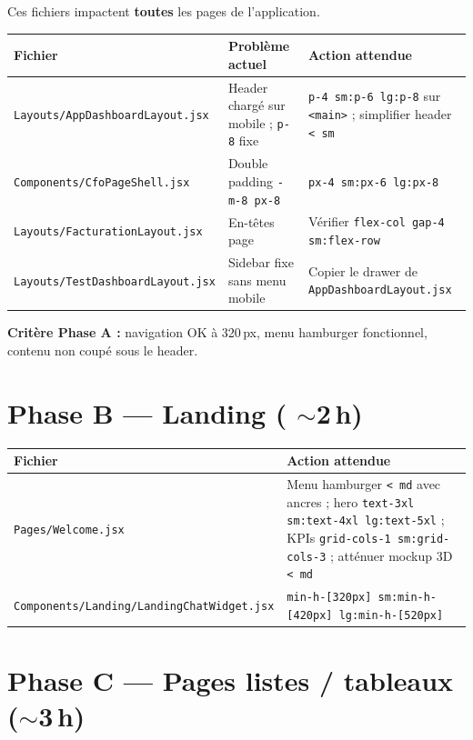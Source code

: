 \documentclass[11pt,a4paper]{report}
\newcommand{\filepath}[1]{\texttt{\small #1}}
\begin{document}
Ces fichiers impactent \textbf{toutes} les pages de l'application.

\begin{longtable}{@{}p{5.2cm}p{4.2cm}p{5.6cm}@{}}
\toprule
\textbf{Fichier} & \textbf{Problème actuel} & \textbf{Action attendue} \\
\midrule
\endhead
\filepath{Layouts/AppDashboardLayout.jsx} &
Header chargé sur mobile ; \texttt{p-8} fixe &
\texttt{p-4 sm:p-6 lg:p-8} sur \texttt{<main>} ; simplifier header \texttt{< sm} \\
\filepath{Components/CfoPageShell.jsx} &
Double padding \texttt{-m-8 px-8} &
\texttt{px-4 sm:px-6 lg:px-8} \\
\filepath{Layouts/FacturationLayout.jsx} &
En-têtes page &
Vérifier \texttt{flex-col gap-4 sm:flex-row} \\
\filepath{Layouts/TestDashboardLayout.jsx} &
Sidebar fixe sans menu mobile &
Copier le drawer de \filepath{AppDashboardLayout.jsx} \\
\bottomrule
\end{longtable}

\textbf{Critère Phase A :} navigation OK à 320\,px, menu hamburger fonctionnel, contenu non coupé sous le header.

\section{Phase B — Landing ( $\sim$2\,h)}

\begin{longtable}{@{}p{5.5cm}p{8.8cm}@{}}
\toprule
\textbf{Fichier} & \textbf{Action attendue} \\
\midrule
\endhead
\filepath{Pages/Welcome.jsx} &
Menu hamburger \texttt{< md} avec ancres ; hero \texttt{text-3xl sm:text-4xl lg:text-5xl} ; KPIs \texttt{grid-cols-1 sm:grid-cols-3} ; atténuer mockup 3D \texttt{< md} \\
\filepath{Components/Landing/LandingChatWidget.jsx} &
\texttt{min-h-[320px] sm:min-h-[420px] lg:min-h-[520px]} \\
\bottomrule
\end{longtable}

\section{Phase C — Pages listes / tableaux ($\sim$3\,h)}
\end{document}
